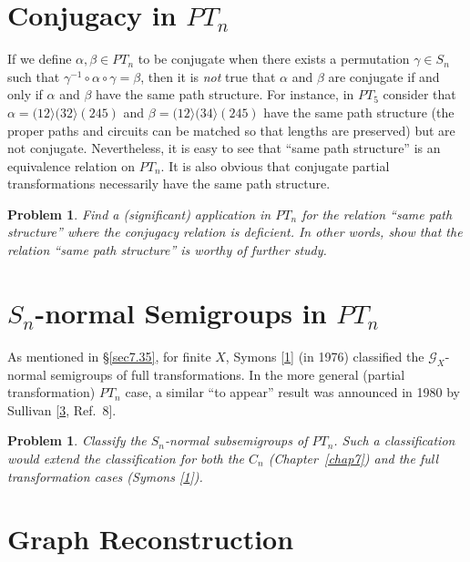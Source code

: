 \documentclass{surv-l}
\numberwithin{equation}{section}
\numberwithin{table}{section}
\numberwithin{figure}{section}
\newtheorem{problem}[equation]{Problem}
\theoremstyle{definition}
\begin{document}
\section{Conjugacy in $PT_{n}$}\label{sec13.64}

If we define $\alpha,\beta\in PT_{n}$ to be conjugate when there
exists a permutation $\gamma\in S_{n}$ such that
$\gamma^{-1}\circ\alpha \circ\gamma=\beta$, then it is \emph{not}
true that $\alpha$ and $\beta$ are conjugate if and only if
$\alpha$ and $\beta$ have the same path structure. For instance,
in $PT_{5}$ consider that $\alpha=(12\rangle(32\rangle(245)$ and
$\beta=(12\rangle(34\rangle(245)$ have the same path structure
(the proper paths and circuits can be matched so that lengths are
preserved) but are not conjugate. Nevertheless, it is easy to see
that ``same path structure'' is an equivalence relation on
$PT_{n}$. It is also obvious that conjugate partial
transformations necessarily have the same path structure.

\begin{problem}\label{prob13.64.1}
Find a (significant) application in $PT_{n}$ for the relation
``same path structure'' where the conjugacy relation is deficient.
In other words, show that the relation ``same path structure'' is
worthy of further study.
\end{problem}

\section{$S_{n}$-normal Semigroups in $PT_{n}$}\label{sec13.65}

As mentioned in \S\ref{sec7.35}, for finite $X$,
Symons [\hyperlink{bib75}{1}] (in
1976) classified the $\mathcal{G}_{X}$-normal semigroups of full
transformations. In the more general (partial transformation)
$PT_{n}$ case, a similar ``to appear'' result was announced in
1980 by Sullivan
[\hyperlink{bib72b}{3}, Ref.~8].

\begin{problem}\label{prob13.65.1}
Classify the $S_{n}$-normal subsemigroups of $PT_{n}$. Such a
classification would extend the classification for both the
$C_{n}$ \emph{(Chapter~\ref{chap7})} and the full transformation
cases \emph{(Symons [\hyperlink{bib75}{1}])}.
\end{problem}

\section{Graph Reconstruction}\label{sec13.66}
\end{document}
